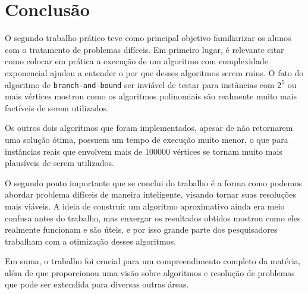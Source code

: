 \documentclass{article}
\begin{document}
\section{Conclusão}

O segundo trabalho prático teve como principal objetivo familiarizar os alunos com o tratamento de problemas difíceis. Em primeiro lugar, é relevante citar como colocar em prática a execução de um algoritmo com complexidade exponencial ajudou a entender o por que desses algoritmos serem ruins. O fato do algoritmo de \texttt{branch-and-bound} ser inviável de testar para instâncias com 2$^{5}$ ou mais vértices mostrou como os algoritmos polinomiais são realmente muito mais factíveis de serem utilizados.

Os outros dois algoritmos que foram implementados, apesar de não retornarem uma solução ótima, possuem um tempo de execução muito menor,  o que para instâncias reais que envolvem mais de 100000 vértices se tornam muito mais plausíveis de serem utilizados.

O segundo ponto importante que se conclui do trabalho é a forma como podemos abordar problema difíceis de maneira inteligente, visando tornar suas resoluções mais viáveis. A ideia de construir um algoritmo aproximativo ainda era meio confusa antes do trabalho, mas enxergar os resultados obtidos mostrou como eles realmente funcionam e são úteis, e por isso grande parte dos pesquisadores trabalham com a otimização desses algoritmos.

Em suma, o trabalho foi crucial para um compreendimento completo da matéria, além de que proporcionou uma visão sobre algoritmos e resolução de problemas que pode ser extendida para diversas outras áreas.

\printbibliography
\end{document}
